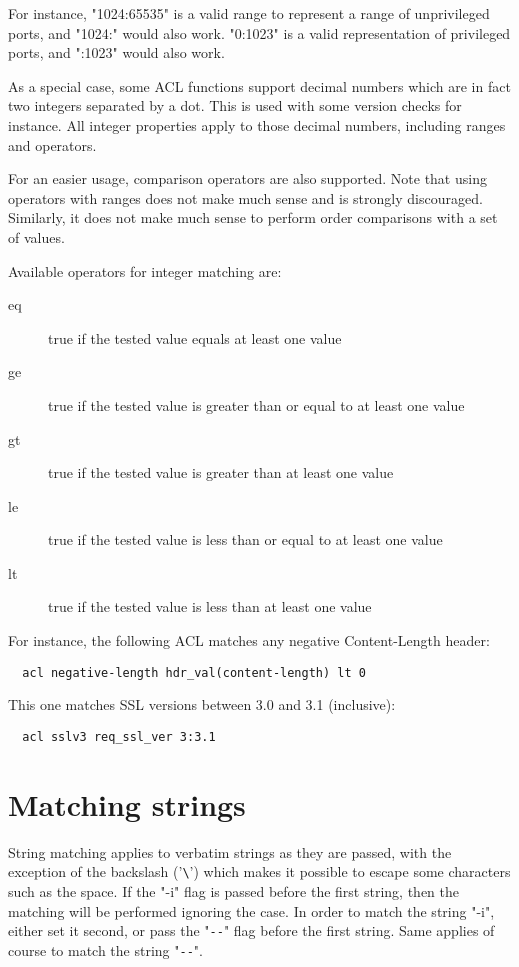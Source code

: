 For instance, "1024:65535" is a valid range to represent a range of
unprivileged ports, and "1024:" would also work. "0:1023" is a valid
representation of privileged ports, and ":1023" would also work.

As a special case, some ACL functions support decimal numbers which are in fact
two integers separated by a dot. This is used with some version checks for
instance. All integer properties apply to those decimal numbers, including
ranges and operators.

For an easier usage, comparison operators are also supported. Note that using
operators with ranges does not make much sense and is strongly discouraged.
Similarly, it does not make much sense to perform order comparisons with a set
of values.

Available operators for integer matching are:

\begin{description}
\item[eq] true if the tested value equals at least one value
\item[ge] true if the tested value is greater than or equal to at least one value
\item[gt] true if the tested value is greater than at least one value
\item[le] true if the tested value is less than or equal to at least one value
\item[lt] true if the tested value is less than at least one value
\end{description}

For instance, the following ACL matches any negative Content-Length header:

\begin{verbatim}
  acl negative-length hdr_val(content-length) lt 0
\end{verbatim}

This one matches SSL versions between 3.0 and 3.1 (inclusive):

\begin{verbatim}
  acl sslv3 req_ssl_ver 3:3.1
\end{verbatim}

\section{Matching strings}

String matching applies to verbatim strings as they are passed, with the
exception of the backslash ('\verb|\|') which makes it possible to escape some
characters such as the space. If the "-i" flag is passed before the first
string, then the matching will be performed ignoring the case. In order
to match the string "-i", either set it second, or pass the "\verb|--|" flag
before the first string. Same applies of course to match the string "\verb|--|".


